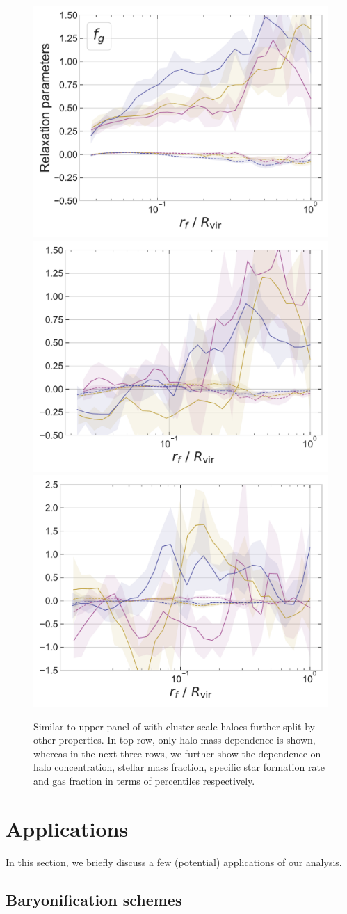 \begin{figure}
    \includegraphics[width=0.32\linewidth]{plots/fit_params_rf_M-fg_T_13.pdf}
    \includegraphics[width=0.32\linewidth]{plots/fit_params_rf_M-fg_T_13.5.pdf}
    \includegraphics[width=0.32\linewidth]{plots/fit_params_rf_M-fg_T_14.pdf}
    
    \caption{Similar to upper panel of  with cluster-scale haloes further split by other properties. In top row, only halo mass dependence is shown, whereas in the next three rows, we further show the dependence on halo concentration, stellar mass fraction, specific star formation rate and gas fraction in terms of percentiles respectively.} 
    \label{fig:fit-func-rf-13514-ch:z0main}
\end{figure}





\section{Applications}
\label{sec:applic-ch:z0main}
In this section, we briefly discuss a few (potential) applications of our analysis.

\subsection{Baryonification schemes}


